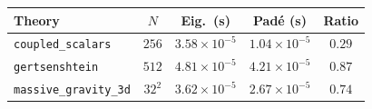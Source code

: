 \begin{tabular}{lcccc}
  \toprule
  Theory & $N$ & Eig.\ (s) & Pad\'e (s) & Ratio \\
  \midrule
  \lstinline!coupled_scalars! & $256$ & $3.58\times10^{-5}$ & $1.04\times10^{-5}$ & $0.29$ \\
  \lstinline!gertsenshtein! & $512$ & $4.81\times10^{-5}$ & $4.21\times10^{-5}$ & $0.87$ \\
  \lstinline!massive_gravity_3d! & $32^2$ & $3.62\times10^{-5}$ & $2.67\times10^{-5}$ & $0.74$ \\
  \bottomrule
\end{tabular}
